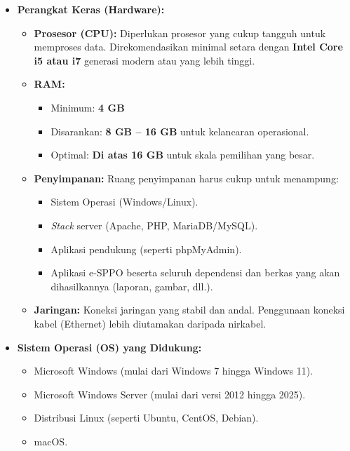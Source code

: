 \begin{itemize}
	\item \textbf{Perangkat Keras (Hardware):}
	\begin{itemize}
		\item \textbf{Prosesor (CPU):} Diperlukan prosesor yang cukup tangguh untuk memproses data. Direkomendasikan minimal setara dengan \textbf{Intel Core i5 atau i7} generasi modern atau yang lebih tinggi.
		\item \textbf{RAM:}
		\begin{itemize}
			\item Minimum: \textbf{4 GB}
			\item Disarankan: \textbf{8 GB -- 16 GB} untuk kelancaran operasional.
			\item Optimal: \textbf{Di atas 16 GB} untuk skala pemilihan yang besar.
		\end{itemize}
		\item \textbf{Penyimpanan:} Ruang penyimpanan harus cukup untuk menampung:
		\begin{itemize}
			\item Sistem Operasi (Windows/Linux).
			\item \textit{Stack} server (Apache, PHP, MariaDB/MySQL).
			\item Aplikasi pendukung (seperti phpMyAdmin).
			\item Aplikasi e-SPPO beserta seluruh dependensi dan berkas yang akan dihasilkannya (laporan, gambar, dll.).
		\end{itemize}
		\item \textbf{Jaringan:} Koneksi jaringan yang stabil dan andal. Penggunaan koneksi kabel (Ethernet) lebih diutamakan daripada nirkabel.
	\end{itemize}
	\item \textbf{Sistem Operasi (OS) yang Didukung:}
	\begin{itemize}
		\item Microsoft Windows (mulai dari Windows 7 hingga Windows 11).
		\item Microsoft Windows Server (mulai dari versi 2012 hingga 2025).
		\item Distribusi Linux (seperti Ubuntu, CentOS, Debian).
		\item macOS.
	\end{itemize}
\end{itemize}

